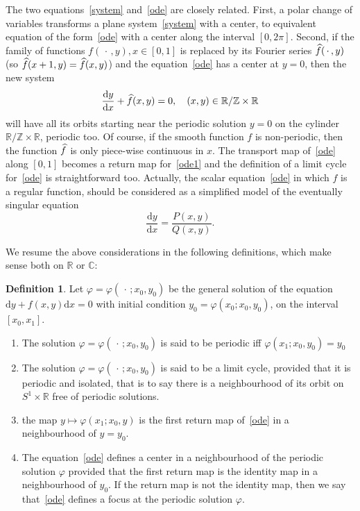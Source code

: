 \documentclass[11pt]{article}
\theoremstyle{definition}
\newtheorem{defi}[theo]{Definition}
\numberwithin{equation}{section}
\numberwithin{figure}{section}
\numberwithin{table}{section}
\newcommand*{\dd}{\mathrm{d}}
\newcommand*{\dx}{\dd x}
\newcommand*{\dy}{\dd y}
\newcommand*\R{\mathbb{R}}
\newcommand{\Cbb}{\mathbb C}
\newcommand*\Z{\mathbb Z}
\newcommand*{\romanenumi}{\renewcommand*{\theenumi}{\roman{enumi}}}
\let\oldhat\hat
\renewcommand*{\hat}[1]{\mathchoice{\widehat{#1}}{\widehat{#1}}{\oldhat{#1}}{\oldhat{#1}}}
\begin{document}
The two equations~\eqref{system} and~\eqref{ode} are closely related. First, a polar change of variables transforms a plane system~\eqref{system} with a center, to equivalent equation of the form~\eqref{ode} with a center along the interval $[0,2\pi]$. Second, if the family of functions $f({\,\cdot\,},y), x\in [0,1]$ is replaced by its Fourier series $\hat{f}({\,\cdot\,},y)$ (so $\hat{f}(x+1,y) = \hat{f}(x,y)$) and the equation~\eqref{ode} has a center at $y=0$, then the new system
\begin{align}\label{ode1}
\frac{\dy}{\dx} + \hat{f}(x,y) = 0, \quad(x,y)\in \R / \Z \times \R
\end{align}
will have all its orbits starting near the periodic solution $y=0$ on the cylinder $ \R / \Z \times \R$, periodic too. Of course, if the smooth function $f$ is non-periodic, then the function $\hat{f}$ is only piece-wise continuous in $x$. The transport map of~\eqref{ode} along $[0,1]$ becomes a return map for~\eqref{ode1} and the definition of a limit cycle for~\eqref{ode} is straightforward too. Actually, the scalar equation~\eqref{ode} in which $f$ is a regular function, should be considered as a simplified model of the eventually singular equation
\[
\frac{\dy}{\dx} = \frac{P(x,y)}{Q(x,y)}.
\]

We resume the above considerations in the following definitions, which make sense both on $\R$ or $\Cbb$:
\begin{defi}\label{def1}
Let $ \varphi = \varphi({\,\cdot\,}; x_0,y_0)$ be the general solution of the equation $\dy + f(x,y)\dx=0$ with initial condition $y_0=\varphi(x_0; x_0,y_0)$, on the interval $ [x_0,x_1]$.
\begin{enumerate}\romanenumi
\item \label{list1.2.1}The solution $ \varphi = \varphi({\,\cdot\,}; x_0,y_0)$ is said to be periodic iff $\varphi(x_1; x_0,y_0) = y_0$
\item \label{list1.2.2}The solution $ \varphi = \varphi({\,\cdot\,}; x_0,y_0)$ is said to be a limit cycle, provided that it is periodic and isolated, that is to say there is a neighbourhood of its orbit on $S^1\times \R$ free of periodic solutions.
\item \label{list1.2.3}the map $y \mapsto \varphi(x_1; x_0,y) $ is the first return map of~\eqref{ode} in a neighbourhood of $ y=y_0$.
\item \label{list1.2.4}The equation~\eqref{ode} defines a center in a neighbourhood of the periodic solution $\varphi$ provided that the first return map is the identity map in a neighbourhood of $y_0$. If the return map is not the identity map, then we say that~\eqref{ode} defines a focus at the periodic solution $\varphi$.
\end{enumerate}
\end{defi}
\end{document}
